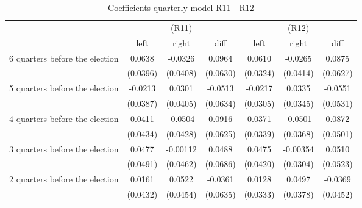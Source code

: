 \begin{table}[!ht]\centering \footnotesize
\def\sym#1{\ifmmode^{#1}\else\(^{#1}\)\fi}
\caption{Coefficients quarterly model R11 - R12}
\begin{tabular}{l*{6}{c}}
\hline\hline
                    &\multicolumn{3}{c}{(R11)}&\multicolumn{3}{c}{(R12)}\\
&\multicolumn{1}{c}{left}&\multicolumn{1}{c}{right}&\multicolumn{1}{c}{diff}&\multicolumn{1}{c}{left}&\multicolumn{1}{c}{right}&\multicolumn{1}{c}{diff}\\
\hline
 6 quarters before the election&      0.0638         &     -0.0326         &      0.0964         &      0.0610         &     -0.0265         &      0.0875         \\
                    &    (0.0396)         &    (0.0408)         &    (0.0630)         &    (0.0324)         &    (0.0414)         &    (0.0627)         \\
[0.5em]
 5 quarters before the election&     -0.0213         &      0.0301         &     -0.0513         &     -0.0217         &      0.0335         &     -0.0551         \\
                    &    (0.0387)         &    (0.0405)         &    (0.0634)         &    (0.0305)         &    (0.0345)         &    (0.0531)         \\
[0.5em]
 4 quarters before the election&      0.0411         &     -0.0504         &      0.0916         &      0.0371         &     -0.0501         &      0.0872         \\
                    &    (0.0434)         &    (0.0428)         &    (0.0625)         &    (0.0339)         &    (0.0368)         &    (0.0501)         \\
[0.5em]
 3 quarters before the election&      0.0477         &    -0.00112         &      0.0488         &      0.0475         &    -0.00354         &      0.0510         \\
                    &    (0.0491)         &    (0.0462)         &    (0.0686)         &    (0.0420)         &    (0.0304)         &    (0.0523)         \\
[0.5em]
 2 quarters before the election&      0.0161         &      0.0522         &     -0.0361         &      0.0128         &      0.0497         &     -0.0369         \\
                    &    (0.0432)         &    (0.0454)         &    (0.0635)         &    (0.0333)         &    (0.0378)         &    (0.0452)         \\

\end{tabular}
\end{table}
